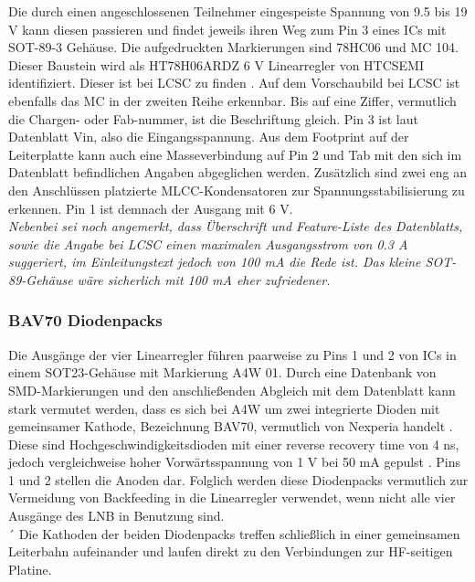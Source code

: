 \documentclass[]{article}
\begin{document}
		\noindent Die durch einen angeschlossenen Teilnehmer eingespeiste Spannung von 9.5 bis 19 V \parencite[siehe][]{Fuba417Manual} kann diesen passieren und findet jeweils ihren Weg zum Pin 3 eines ICs mit SOT-89-3 Gehäuse. Die aufgedruckten Markierungen sind 78HC06 und MC 104. Dieser Baustein wird als HT78H06ARDZ 6 V Linearregler von HTCSEMI identifiziert. Dieser ist bei LCSC zu finden \parencite[siehe][]{HT78H06ARDZ_LCSC}. Auf dem Vorschaubild bei LCSC ist ebenfalls das \glqq MC\grqq{} in der zweiten Reihe erkennbar. Bis auf eine Ziffer, vermutlich die Chargen- oder Fab-nummer, ist die Beschriftung gleich. Pin 3 ist laut Datenblatt \parencite[siehe][]{HT78H06ARDZ_Datasheet} Vin, also die Eingangsspannung. Aus dem Footprint auf der Leiterplatte kann auch eine Masseverbindung auf Pin 2 und Tab mit den sich im Datenblatt befindlichen Angaben abgeglichen werden. Zusätzlich sind zwei eng an den Anschlüssen platzierte MLCC-Kondensatoren zur Spannungsstabilisierung zu erkennen. Pin 1 ist demnach der Ausgang mit 6 V.\\
		
		\noindent \textit{Nebenbei sei noch angemerkt, dass Überschrift und Feature-Liste des Datenblatts, sowie die Angabe bei LCSC einen maximalen Ausgangsstrom von 0.3 A suggeriert, im Einleitungstext jedoch von 100 mA die Rede ist. Das kleine SOT-89-Gehäuse wäre sicherlich mit 100 mA eher zufriedener.}\\
		
		
	\subsubsection{BAV70 Diodenpacks}
		
		\noindent Die Ausgänge der vier Linearregler führen paarweise zu Pins 1 und 2 von ICs in einem SOT23-Gehäuse mit Markierung A4W 01. Durch eine Datenbank von SMD-Markierungen und den anschließenden Abgleich mit dem Datenblatt kann stark vermutet werden, dass es sich bei A4W um zwei integrierte Dioden mit gemeinsamer Kathode, Bezeichnung BAV70, vermutlich von Nexperia handelt \parencite[siehe][]{BAV70_Datasheet}. Diese sind Hochgeschwindigkeitsdioden mit einer reverse recovery time von 4 ns, jedoch vergleichweise hoher Vorwärtsspannung von 1 V bei 50 mA \glqq gepulst \grqq{}. Pins 1 und 2 stellen die Anoden dar. Folglich werden diese Diodenpacks vermutlich zur Vermeidung von Backfeeding in die Linearregler verwendet, wenn nicht alle vier Ausgänge des LNB in Benutzung sind.\\
		´
		\noindent Die Kathoden der beiden Diodenpacks treffen schließlich in einer gemeinsamen Leiterbahn aufeinander und laufen direkt zu den Verbindungen zur HF-seitigen Platine.\\
		
\end{document}

